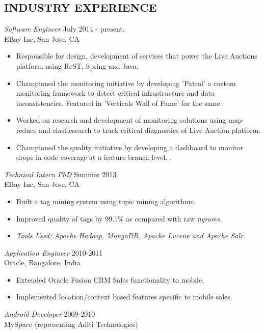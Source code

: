 \documentclass[line,margin]{res}
\begin{document}
\begin{resume}
		\section{INDUSTRY EXPERIENCE} 
		{\sl Software Engineer} \hfill July 2014 - present.\\
		EBay Inc, San Jose, CA
		\begin{itemize}  \itemsep -2pt %
			\item Responsible for design, development of services that power the Live Auctions platform using ReST, Spring and Java.
			\item Championed the monitoring initiative by developing 'Patrol' a custom monitoring framework to detect critical infrastructure and data inconsistencies. Featured in 'Verticals Wall of Fame' for the same.
			\item Worked on research and development of monitoring solutions using map-reduce and elasticsearch to track critical diagnostics of Live Auction platform. 
			\item Championed the quality initiative by developing a dashboard to monitor drops in code coverage at a feature branch level. .
		\end{itemize}
		{\sl Technical Intern PhD} \hfill Summer 2013\\
		EBay Inc, San Jose, CA
		\begin{itemize}  \itemsep -2pt %
			\item Built a tag mining system using topic mining algorithms.
			\item Improved quality of tags by 99.1\% as compared with raw \emph{ngrams}.
			\item \emph{Tools Used: Apache Hadoop, MongoDB, Apache Lucene and Apache Solr.}
		\end{itemize}
		{\sl Application Engineer} \hfill 2010-2011 \\
		Oracle, 
		Bangalore, India
		\begin{itemize}  \itemsep -2pt %
			\item Extended Oracle Fusion CRM Sales functionality to mobile.
			\item Implemented location/context based features specific to mobile sales.
		\end{itemize}
		{\sl Android Developer} \hfill            2009-2010 \\
		MySpace (representing Aditi Technologies) 
		\begin{itemize}  \itemsep -2pt %

\end{itemize}
\end{resume}
\end{document}
